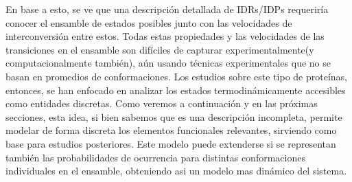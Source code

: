 En base a esto, se ve que una descripción detallada de IDRs/IDPs requeriría conocer el ensamble de estados posibles junto con las velocidades de interconversión entre estos.
Todas estas propiedades y las velocidades de las transiciones en el ensamble son difíciles de capturar experimentalmente(y computacionalmente también), aún usando técnicas experimentales que no se basan en promedios de conformaciones.
Los estudios sobre este tipo de proteínas, entonces, se han enfocado en analizar los estados termodinámicamente accesibles como entidades discretas.
Como veremos a continuación y en las próximas secciones, esta idea, si bien sabemos que es una descripción incompleta, permite modelar de forma discreta los elementos funcionales relevantes, sirviendo como base para estudios posteriores.
Este modelo puede extenderse si se representan también las probabilidades de ocurrencia para distintas conformaciones individuales en el ensamble, obteniendo asi un modelo mas dinámico del sistema.




